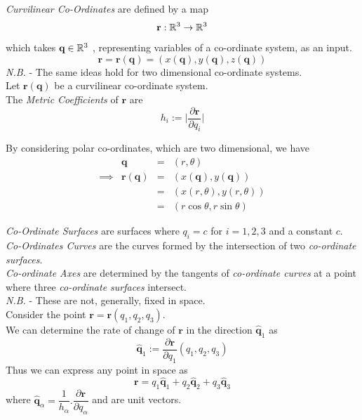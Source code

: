 \documentclass[11pt,a4paper]{article}
\begin{document}
\textit{Curvilinear Co-Ordinates} are defined by a map
$$\textbf{r} : \mathbb{R}^3\to\mathbb{R}^3$$
which takes $\textbf{q}\in\mathbb{R}^3$ , representing variables of a co-ordinate system, as an input.
$$\textbf{r}=\textbf{r}(\textbf{q})=(x(\textbf{q}), y(\textbf{q}), z(\textbf{q}))$$
\textit{N.B.} - The same ideas hold for two dimensional co-ordinate systems.\\

Let $\textbf{r}(\textbf{q})$ be a curvilinear co-ordinate system.\\
The \textit{Metric Coefficients} of $\textbf{r}$ are
$$h_i:=\bigg|\frac{\partial\textbf{r}}{\partial q_i}\bigg|$$

By considering polar co-ordinates, which are two dimensional, we have
\[\begin{array}{rrcl}
&\textbf{q}&=&(r,\theta)\\
\implies&\textbf{r}(\textbf{q})&=&(x(\textbf{q}),y(\textbf{q}))\\
&&=&(x(r,\theta), y(r,\theta))\\
&&=&(r\cos\theta, r\sin\theta)
\end{array}\]

\textit{Co-Ordinate Surfaces} are surfaces where $q_i=c$ for $i=1,2,3$ and a constant $c$.\\

\textit{Co-Ordinates Curves} are the curves formed by the intersection of two \textit{co-ordinate surfaces}.\\

\textit{Co-ordinate Axes} are determined by the tangents of \textit{co-ordinate curves} at a point where three \textit{co-ordinate surfaces} intersect.\\
\textit{N.B.} - These are not, generally, fixed in space.\\

Consider the point $\textbf{r}=\textbf{r}(q_1,q_2,q_3)$.\\
We can determine the rate of change of $\textbf{r}$ in the direction $\hat{\textbf{q}}_1$ as
$$\hat{\textbf{q}}_1:=\frac{\partial \textbf{r}}{\partial q_1}(q_1,q_2,q_3)$$
Thus we can express any point in space as
$$\textbf{r}=q_1\hat{\textbf{q}}_1+q_2\hat{\textbf{q}}_2+q_3\hat{\textbf{q}}_3$$
where $\hat{\textbf{q}}_\alpha=\dfrac{1}{h_\alpha}.\dfrac{\partial \textbf{r}}{\partial q_\alpha}$ and are unit vectors.\\
\end{document}
